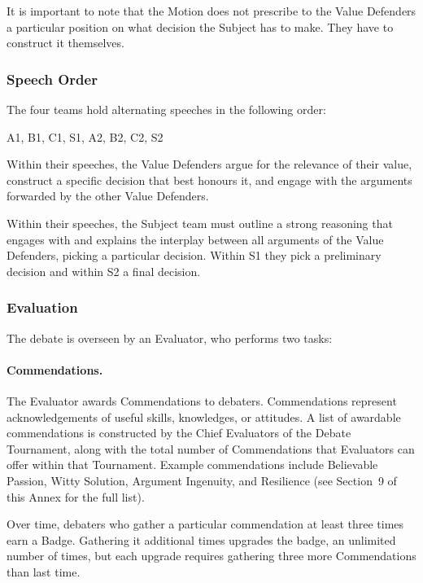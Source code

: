 It is important to note that the Motion does not prescribe to the Value Defenders a particular position on what decision the Subject has to make. They have to construct it themselves.

\subsubsection{Speech Order}

The four teams hold alternating speeches in the following order:

\begin{center}
A1, B1, C1, S1, A2, B2, C2, S2
\end{center}

Within their speeches, the Value Defenders argue for the relevance of their value, construct a specific decision that best honours it, and engage with the arguments forwarded by the other Value Defenders.

Within their speeches, the Subject team must outline a strong reasoning that engages with and explains the interplay between all arguments of the Value Defenders, picking a particular decision. Within S1 they pick a preliminary decision and within S2 a final decision.

\subsubsection{Evaluation}

The debate is overseen by an Evaluator, who performs two tasks:

\paragraph{Commendations.} The Evaluator awards Commendations to debaters. Commendations represent acknowledgements of useful skills, knowledges, or attitudes. A list of awardable commendations is constructed by the Chief Evaluators of the Debate Tournament, along with the total number of Commendations that Evaluators can offer within that Tournament. Example commendations include Believable Passion, Witty Solution, Argument Ingenuity, and Resilience (see Section~9 of this Annex for the full list).

Over time, debaters who gather a particular commendation at least three times earn a Badge. Gathering it additional times upgrades the badge, an unlimited number of times, but each upgrade requires gathering three more Commendations than last time.

